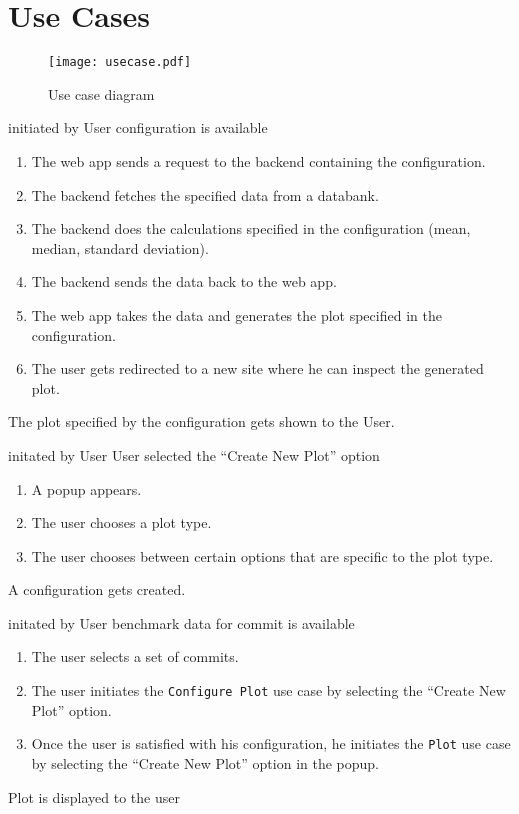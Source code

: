 \section{Use Cases}

\begin{figure}[H]
    \texttt{[image: usecase.pdf]}
    \caption{Use case diagram}
    \label{fig:usecase}
\end{figure}

{initiated by User}
{\gls{configuration} is available}
{\begin{enumerate}
    \item The web app sends a request to the backend containing the \gls{configuration}.
    \item The backend fetches the specified data from a databank.
    \item The backend does the calculations specified in the \gls{configuration} (mean, median, standard deviation).
    \item The backend sends the data back to the web app.
    \item The web app takes the data and generates the plot specified in the \gls{configuration}.
    \item The user gets redirected to a new site where he can inspect the generated plot.
\end{enumerate}}
{The plot specified by the \gls{configuration} gets shown to the User.}

\bigskip

{initated by User}
{User selected the \enquote{Create New Plot} option}
{\begin{enumerate}
    \item A popup appears.
    \item The user chooses a plot type.
    \item The user chooses between certain options that are specific to the plot type.
\end{enumerate}}
{A \gls{configuration} gets created.}

\bigskip

{initated by User}
{benchmark data for commit is available}
{\begin{enumerate}
    \item The user selects a set of commits.
    \item The user initiates the \texttt{Configure Plot} use case by selecting the \enquote{Create New Plot} option.
    \item Once the user is satisfied with his \gls{configuration}, he initiates the \texttt{Plot} use case by selecting the \enquote{Create New Plot} option in the popup.
\end{enumerate}}
{Plot is displayed to the user}

